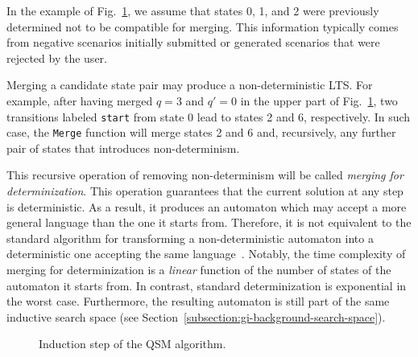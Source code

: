 \begin{description}
In the example of Fig.~\ref{Fig:algo:steps}, we assume that states 0, 1, and 2 were previously determined not to be compatible for merging. This information typically comes from negative scenarios initially submitted or generated scenarios that were rejected by the user. 

Merging a candidate state pair may produce a non-deterministic LTS. For example, after having merged $q = 3$ and $q' = 0$ in the upper part of Fig.~\ref{Fig:algo:steps}, two transitions labeled \texttt{start} from state 0 lead to states 2 and 6, respectively. In such case, the \texttt{Merge} function will merge states 2 and 6 and, recursively, any further pair of states that introduces non-determinism. 

This recursive operation of removing non-determinism will be called \textsl{merging for determinization}. This operation guarantees that the current solution at any step is deterministic. As a result, it produces an automaton which may accept a more general language than the one it starts from. Therefore, it is not equivalent to the standard algorithm for transforming a non-deterministic automaton into a deterministic one accepting the same language~\cite{Hopcroft:1979}. Notably, the time complexity of merging for determinization is a \emph{linear} function of the number of states of the automaton it starts from. In contrast, standard determinization is exponential in the worst case. Furthermore, the resulting automaton is still part of the same inductive search space (see Section~\ref{subsection:gi-background-search-space}). 

\begin{figure}[H]
\centering
{}
\caption{Induction step of the \textsc{QSM} algorithm\label{Fig:algo:steps}.}
\end{figure}


\end{description}
